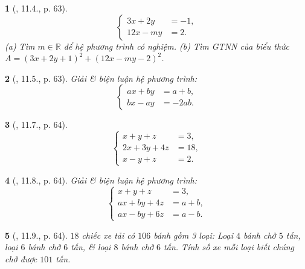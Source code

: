\documentclass{article}
\newtheorem{baitoan}{}
\begin{document}
\begin{baitoan}[\cite{TLCT_THCS_Toan_9_dai_so}, 11.4., p. 63]
	\begin{equation*}
		\left\{\begin{split}
			3x + 2y &= -1,\\
			12x - my &= 2.
		\end{split}\right.
	\end{equation*}
	(a) Tìm $m\in\mathbb{R}$ để hệ phương trình có nghiệm. (b) Tìm {\rm GTNN} của biểu thức $A = (3x + 2y + 1)^2 + (12x - my - 2)^2$.
\end{baitoan}

\begin{baitoan}[\cite{TLCT_THCS_Toan_9_dai_so}, 11.5., p. 63]
	Giải \& biện luận hệ phương trình:
	\begin{equation*}
		\left\{\begin{split}
			ax + by &= a + b,\\
			bx - ay &= -2ab.
		\end{split}\right.
	\end{equation*}
\end{baitoan}

\begin{baitoan}[\cite{TLCT_THCS_Toan_9_dai_so}, 11.7., p. 64]
	\begin{equation*}
		\left\{\begin{split}
			x + y + z &= 3,\\
			2x + 3y + 4z &= 18,\\
			x - y + z &= 2.
		\end{split}\right.
	\end{equation*}
\end{baitoan}

\begin{baitoan}[\cite{TLCT_THCS_Toan_9_dai_so}, 11.8., p. 64]
	Giải \& biện luận hệ phương trình:
	\begin{equation*}
		\left\{\begin{split}
			x + y + z &= 3,\\
			ax + by + 4z &= a + b,\\
			ax - by + 6z &= a - b.
		\end{split}\right.
	\end{equation*}
\end{baitoan}

\begin{baitoan}[\cite{TLCT_THCS_Toan_9_dai_so}, 11.9., p. 64]
	$18$ chiếc xe tải có $106$ bánh gồm 3 loại: Loại $4$ bánh chở $5$ tấn, loại $6$ bánh chở $6$ tấn, \& loại $8$ bánh chở $6$ tấn. Tính số xe mỗi loại biết chúng chở được $101$ tấn.
\end{baitoan}
\end{document}
